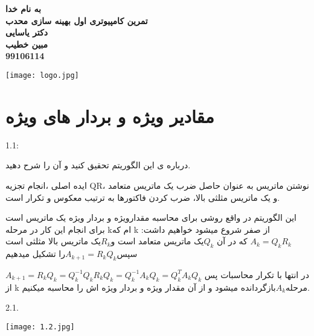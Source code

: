 

\begin{titlepage}
\begin{center}

\Huge
\textbf{به نام خدا}\\[2cm]

\huge
\textbf{تمرین کامپیوتری اول بهینه سازی محدب }\\[0.5cm]
\textbf{دکتر یاسایی}\\[1.5cm]

\Large
\textbf{مبین خطیب}\\[0.3cm]
\textbf{99106114}\\[0.5cm]







\begin{center}
    \texttt{[image: logo.jpg]}
\end{center}
\end{center}
\end{titlepage}




\newpage
\huge
\section{ مقادیر ویژه و بردار های ویژه}
\large

1.1:

 درباره ی این الگوریتم تحقیق کنید و آن را شرح دهید. 

ایده اصلی ،انجام تجزیه QR، نوشتن ماتریس به عنوان حاصل ضرب یک ماتریس متعامد و یک ماتریس مثلثی بالا، ضرب کردن فاکتورها به ترتیب معکوس و تکرار است.

این الگوریتم در واقع روشی برای محاسبه مقدارویژه و بردار ویژه یک ماتریس است برای انجام این کار در مرحله kام که k از صفر شروع میشود خواهیم داشت:$ A_k = Q_kR_k$ که در آن $Q_k $یک ماتریس متعامد است و$ R_k $یک ماتریس بالا مثلثی است سپس$ A_{k+1} = R_kQ_k $را تشکیل میدهیم


$ A_{k+1} = R_kQ_k = Q_k^{-1}Q_kR_kQ_k = Q_k^{-1}A_kQ_k  = Q_k^TA_kQ_k $
در انتها با تکرار محاسبات پس از k مرحله$ A_k $بازگردانده میشود و از آن مقدار ویژه و بردار ویژه اش را محاسبه میکنیم.

2.1.

\begin{center}
    \texttt{[image: 1.2.jpg]}
\end{center}

